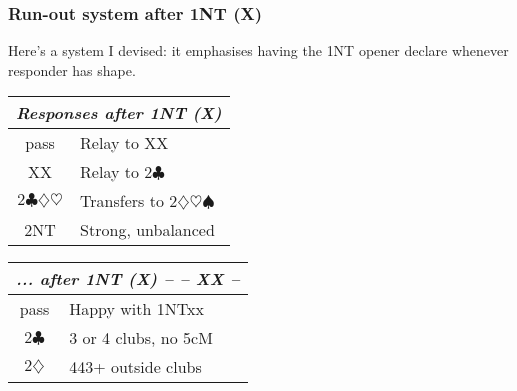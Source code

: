 \documentclass[a4paper, twoside, 11pt]{article}
\begin{document}
\begin{multicols}{3}


\subsubsection*{Run-out system after \textnormal{1NT} (X)}
Here's a system I devised: it emphasises having the \textnormal{1NT} opener declare whenever responder has shape.

\begin{center}
\begin{tabular}{ |c|l| }
 \hline
 \multicolumn{2}{|c|}{\textit{Responses after \textnormal{1NT} (X)}} \\
 \hline
 pass & Relay to XX \\
 XX & Relay to $2\clubsuit$ \\
 $2\clubsuit\diamondsuit\heartsuit$ & Transfers to $2\diamondsuit\heartsuit\spadesuit$ \\
 \textnormal{2NT} & Strong, unbalanced\\
 \hline
\end{tabular}
\end{center}



\begin{center}
\begin{tabular}{ |c|l| }
 \hline
 \multicolumn{2}{|c|}{\textit{... after \textnormal{1NT} (X) -- -- XX --}} \\
 \hline
 pass & Happy with \textnormal{1NT}xx \\
 $2\clubsuit$ & 3 or 4 clubs, no 5cM \\
 $2\diamondsuit$ & 443+ outside clubs \\
 \hline
\end{tabular}
\end{center}


\end{multicols}
\end{document}

